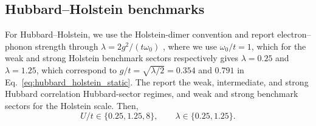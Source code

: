 \documentclass[
  reprint,
  amsmath,
  amssymb,
  aps,
  pra,
  nofootinbib,
  superscriptaddress,
  floatfix
]{revtex4-2}
\begin{document}
\subsection{Hubbard--Holstein benchmarks}

For Hubbard--Holstein, we use the Holstein-dimer convention and report electron--phonon strength through \(\lambda=2g^2/(t\omega_0)\) \cite{Sakkinen2015HolsteinDimer}, where  we use
\(\omega_0/t=1\), which for the weak and strong Holstein benchmark sectors respectively gives
\(\lambda=0.25\) and \(\lambda=1.25\), which correspond to
\(g/t=\sqrt{\lambda/2}=0.354\) and \(0.791\) in Eq.~\eqref{eq:hubbard_holstein_static}. 
The report the weak, intermediate, and strong Hubbard correlation Hubbard-sector regimes, and weak and strong benchmark sectors for the Holstein scale. Then,
\[
U/t\in\{0.25,1.25,8\},\qquad \lambda\in\{0.25,1.25\}.
\]

\end{document}
